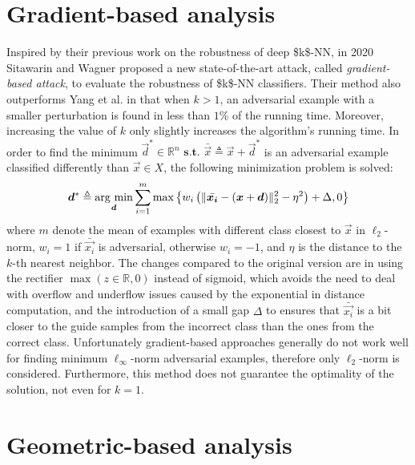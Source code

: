 \section {Gradient-based analysis}
\label{sec:gradient-analysis}

Inspired by their previous work \cite{SitawarinWDeep19} on the robustness of deep \acs{$k$-NN}, in 2020 Sitawarin and Wagner \cite{SitawarinW20} proposed a new state-of-the-art attack, called \emph{gradient-based attack}, to evaluate the robustness of \acs{$k$-NN} classifiers. Their method also outperforms Yang et al. \cite{YangRWC20} in that when $k > 1$, an adversarial example with a smaller perturbation is found in less than $1\%$ of the running time. Moreover, increasing the value of $k$ only slightly increases the algorithm's running time. In order to find the minimum $\vec{d}^* \in \mathbb{R}^n \textbf{ s.t. } \bar{\vec{x}} \triangleq \vec{x} + \vec{d}^*$ is an adversarial example classified differently than $\vec{x} \in X$, the following minimization problem is solved:
\begin{equation*}
	\bm{d}^* \triangleq \operatorname*{\arg\,\min}\limits_{\bm{d}} \sum\limits_{i = 1}^{m} \max\left\{w_i\left(\lVert \bar{\bm{x_i}} - (\bm{x} + \bm{d})\rVert_2^2 - \eta^2\right) + \Delta, 0\right\}
\end{equation*}
where $m$ denote the mean of examples with different class closest to $\vec{x}$ in $\ell_2$-norm, $w_i = 1$ if $\bar{\vec{x_i}}$ is adversarial, otherwise $w_i = -1$, and $\eta$ is the distance to the $k$-th nearest neighbor. The changes compared to the original version are in using the rectifier $\max(z \in \mathbb{R}, 0)$ instead of sigmoid, which avoids the need to deal with overflow and underflow issues caused by the exponential in distance computation, and the introduction of a small gap $\Delta$ to ensures that $\bar{\vec{x_i}}$ is a
bit closer to the guide samples from the incorrect class than the ones from the correct class. Unfortunately gradient-based approaches generally do not work well for finding minimum $\ell_\infty$-norm adversarial examples, therefore only $\ell_2$-norm is considered. Furthermore, this method does not guarantee the optimality of the solution, not even for $k = 1$.

\section {Geometric-based analysis}
\label{sec:geometric-analysis}

